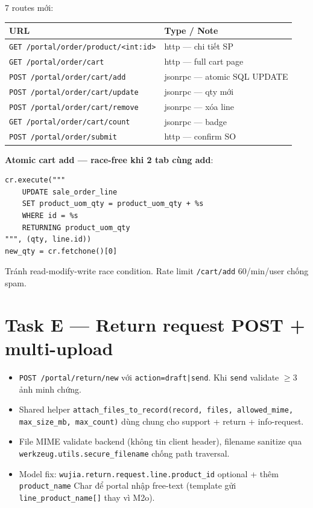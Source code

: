 7 routes mới:

\begin{tabular}{ll}
\toprule
\textbf{URL} & \textbf{Type / Note} \\
\midrule
\texttt{GET /portal/order/product/<int:id>} & http --- chi tiết SP \\
\texttt{GET /portal/order/cart} & http --- full cart page \\
\texttt{POST /portal/order/cart/add} & jsonrpc --- atomic SQL UPDATE \\
\texttt{POST /portal/order/cart/update} & jsonrpc --- qty mới \\
\texttt{POST /portal/order/cart/remove} & jsonrpc --- xóa line \\
\texttt{GET /portal/order/cart/count} & jsonrpc --- badge \\
\texttt{POST /portal/order/submit} & http --- confirm SO \\
\bottomrule
\end{tabular}

\textbf{Atomic cart add --- race-free khi 2 tab cùng add}:

\begin{lstlisting}[style=python]
cr.execute("""
    UPDATE sale_order_line
    SET product_uom_qty = product_uom_qty + %s
    WHERE id = %s
    RETURNING product_uom_qty
""", (qty, line.id))
new_qty = cr.fetchone()[0]
\end{lstlisting}

Tránh read-modify-write race condition. Rate limit \texttt{/cart/add} 60/min/user chống spam.

\section{Task E --- Return request POST + multi-upload}

\begin{itemize}[leftmargin=*]
    \item \texttt{POST /portal/return/new} với \texttt{action=draft|send}. Khi \texttt{send} validate $\geq 3$ ảnh minh chứng.
    \item Shared helper \texttt{attach\_files\_to\_record(record, files, allowed\_mime, max\_size\_mb, max\_count)} dùng chung cho support + return + info-request.
    \item File MIME validate backend (không tin client header), filename sanitize qua \texttt{werkzeug.utils.secure\_filename} chống path traversal.
    \item Model fix: \texttt{wujia.return.request.line.product\_id} optional + thêm \texttt{product\_name} Char để portal nhập free-text (template gửi \texttt{line\_product\_name[]} thay vì M2o).
\end{itemize}

